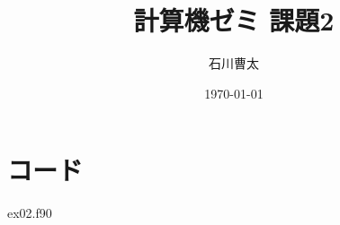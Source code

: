 \documentclass[dvipdfmx]{jsarticle}
\title{計算機ゼミ 課題2}
\author{石川曹太}
\date{\today}
\begin{document}
\maketitle

\section*{コード}
 {ex02.f90}
\end{document}
